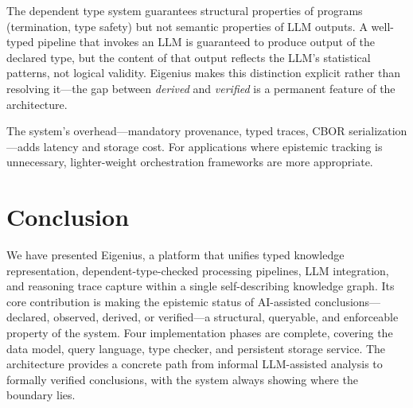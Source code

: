 \documentclass[10pt,twocolumn,letterpaper]{article}
\begin{document}
The dependent type system guarantees structural properties of programs (termination, type safety) but not semantic properties of LLM outputs.
A well-typed pipeline that invokes an LLM is guaranteed to produce output of the declared type, but the content of that output reflects the LLM's statistical patterns, not logical validity.
Eigenius makes this distinction explicit rather than resolving it---the gap between \emph{derived} and \emph{verified} is a permanent feature of the architecture.

The system's overhead---mandatory provenance, typed traces, CBOR serialization---adds latency and storage cost.
For applications where epistemic tracking is unnecessary, lighter-weight orchestration frameworks are more appropriate.


\section{Conclusion}
\label{sec:conclusion}

We have presented Eigenius, a platform that unifies typed knowledge representation, dependent-type-checked processing pipelines, LLM integration, and reasoning trace capture within a single self-describing knowledge graph.
Its core contribution is making the epistemic status of AI-assisted conclusions---declared, observed, derived, or verified---a structural, queryable, and enforceable property of the system.
Four implementation phases are complete, covering the data model, query language, type checker, and persistent storage service.
The architecture provides a concrete path from informal LLM-assisted analysis to formally verified conclusions, with the system always showing where the boundary lies.

\balance
\end{document}

